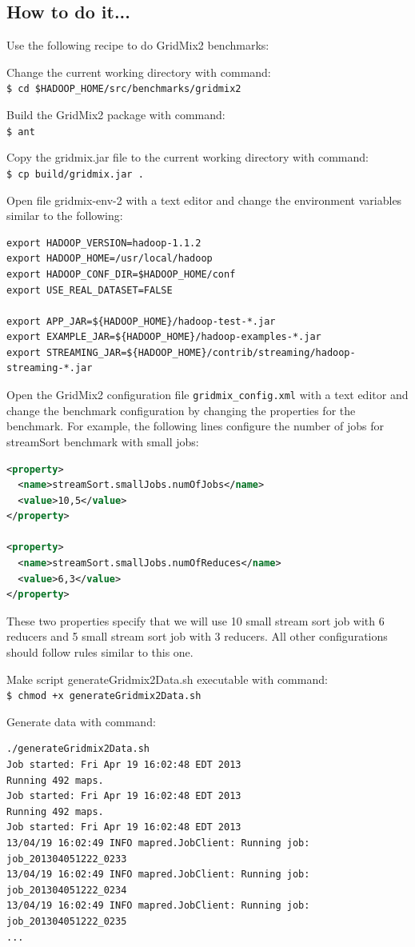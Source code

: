 \subsection*{How to do it...}
Use the following recipe to do GridMix2 benchmarks:

Change the current working directory with command: \\
\verb|$ cd $HADOOP_HOME/src/benchmarks/gridmix2|

Build the GridMix2 package with command: \\
\verb|$ ant|

Copy the gridmix.jar file to the current working directory with command: \\
\verb|$ cp build/gridmix.jar .|

Open file gridmix-env-2 with a text editor and change the environment variables similar to the following:
\lstset{style=bashstyle}
\begin{lstlisting}
export HADOOP_VERSION=hadoop-1.1.2
export HADOOP_HOME=/usr/local/hadoop
export HADOOP_CONF_DIR=$HADOOP_HOME/conf
export USE_REAL_DATASET=FALSE

export APP_JAR=${HADOOP_HOME}/hadoop-test-*.jar
export EXAMPLE_JAR=${HADOOP_HOME}/hadoop-examples-*.jar
export STREAMING_JAR=${HADOOP_HOME}/contrib/streaming/hadoop-streaming-*.jar
\end{lstlisting}

Open the GridMix2 configuration file \verb|gridmix_config.xml| with a text editor and change the benchmark configuration by changing the properties for the benchmark. For example, the following lines configure the number of jobs for streamSort benchmark with small jobs:
\lstset{style=bashstyle}
\begin{lstlisting}[language=XML]
<property>
  <name>streamSort.smallJobs.numOfJobs</name>
  <value>10,5</value>
</property>

<property>
  <name>streamSort.smallJobs.numOfReduces</name>
  <value>6,3</value>
</property>
\end{lstlisting}
These two properties specify that we will use 10 small stream sort job with 6 reducers and 5 small stream sort job with 3 reducers. All other configurations should follow rules similar to this one.

Make script generateGridmix2Data.sh executable with command: \\
\verb|$ chmod +x generateGridmix2Data.sh|

Generate data with command:
\lstset{style=bashstyle}
\begin{lstlisting}
./generateGridmix2Data.sh
Job started: Fri Apr 19 16:02:48 EDT 2013
Running 492 maps.
Job started: Fri Apr 19 16:02:48 EDT 2013
Running 492 maps.
Job started: Fri Apr 19 16:02:48 EDT 2013
13/04/19 16:02:49 INFO mapred.JobClient: Running job: job_201304051222_0233
13/04/19 16:02:49 INFO mapred.JobClient: Running job: job_201304051222_0234
13/04/19 16:02:49 INFO mapred.JobClient: Running job: job_201304051222_0235
...
\end{lstlisting}

